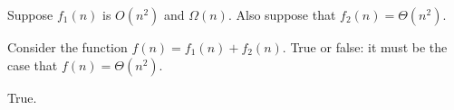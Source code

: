 \begin{prob}
    Suppose $f_1(n)$ is $O(n^2)$ and $\Omega(n)$. Also suppose that $f_2(n) = \Theta(n^2)$.

    Consider the function $f(n) = f_1(n) + f_2(n)$. True or false: it must be 
    the case that $f(n) = \Theta(n^2)$.

    \Tf{}

    \begin{soln}
        True.
    \end{soln}
\end{prob}
